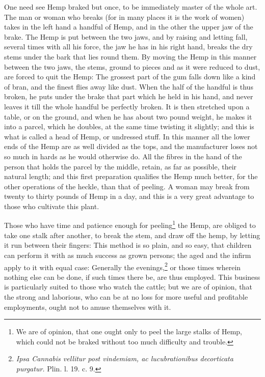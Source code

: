 \documentclass[a4paper, 11pt, oneside, polutonikogreek, english]{article}
\begin{document}
One need see Hemp braked but once, to be immediately master of the whole art. The man or woman who breaks (for in many places it is the work of women) takes in the left hand a handful of Hemp, and in the other the upper jaw of the brake. The Hemp is put between the two jaws, and by raising and letting fall, several times with all his force, the jaw he has in his right hand, breaks the dry stems under the bark that lies round them. By moving the Hemp in this manner between the two jaws, the stems, ground to pieces and as it were reduced to dust, are forced to quit the Hemp: The grossest part of the gum falls down like a kind of bran, and the finest flies away like dust. When the half of the handful is thus broken, he puts under the brake that part which he held in his hand, and never leaves it till the whole handful be perfectly broken. It is then stretched upon a table, or on the ground, and when he has about two pound weight, he makes it into a parcel, which he doubles, at the same time twisting it slightly; and this is what is called a head of Hemp, or undressed stuff. In this manner all the lower ends of the Hemp are as well divided as the tops, and the manufacturer loses not so much in hards as he would otherwise do. All the fibres in the hand of the person that holds the parcel by the middle, retain, as far as possible, their natural length; and this first preparation qualifies the Hemp much better, for the other operations of the heckle, than that of peeling. A woman may break from twenty to thirty pounds of Hemp in a day, and this is a very great advantage to those who cultivate this plant.

Those who have time and patience enough for peeling\footnote{We are of opinion, that one ought only to peel the large stalks of Hemp, which could not be braked without too much difficulty and trouble.} the Hemp, are obliged to take one stalk after another, to break the stem, and draw off the hemp, by letting it run between their fingers: This method is so plain, and so easy, that children can perform it with as much success as grown persons; the aged and the infirm apply to it with equal case: Generally the evenings,\footnote{\emph{Ipsa Cannabis vellitur post vindemiam, ac lucubrationibus decorticata purgatur.} Plin. l. 19. c. 9.} or those times wherein nothing else can be done, if such times there be, are thus employed. This business is particularly suited to those who watch the cattle; but we are of opinion, that the strong and laborious, who can be at no loss for more useful and profitable employments, ought not to amuse themselves with it.
\end{document}
